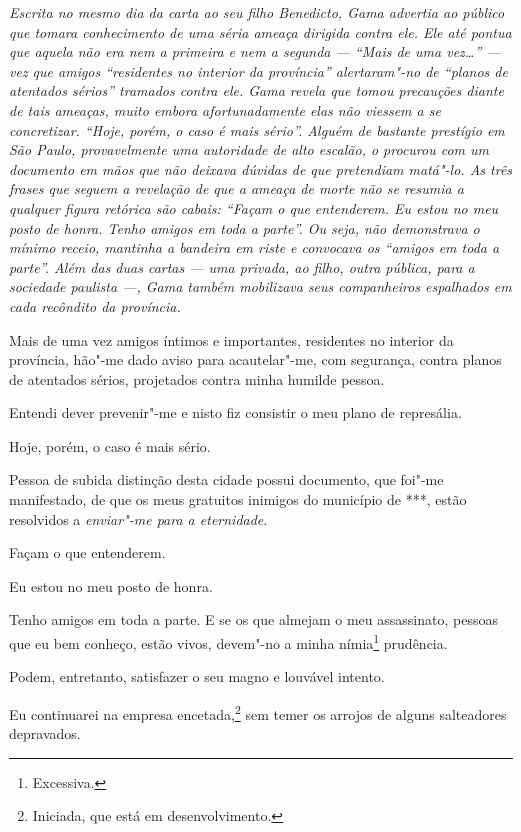\begin{flushleft}
{\footnotesize\itshape
Escrita no mesmo dia da carta ao seu filho Benedicto, Gama
advertia ao público que tomara conhecimento de uma séria ameaça dirigida
contra ele. Ele até pontua que aquela não era nem a primeira e nem a
segunda --- ``Mais de uma vez\ldots{}'' --- vez que amigos ``residentes no
interior da província'' alertaram"-no de ``planos de atentados sérios''
tramados contra ele. Gama revela que tomou precauções diante de tais
ameaças, muito embora afortunadamente elas não viessem a se concretizar.
``Hoje, porém, o caso é mais sério''. Alguém de bastante prestígio em São
Paulo, provavelmente uma autoridade de alto escalão, o procurou com um
documento em mãos que não deixava dúvidas de que pretendiam matá"-lo. As
três frases que seguem a revelação de que a ameaça de morte não se
resumia a qualquer figura retórica são cabais: ``Façam o que entenderem.
Eu estou no meu posto de honra. Tenho amigos em toda a parte''. Ou seja,
não demonstrava o mínimo receio, mantinha a bandeira em riste e
convocava os ``amigos em toda a parte''. Além das duas cartas --- uma
privada, ao filho, outra pública, para a sociedade paulista ---, Gama
também mobilizava seus companheiros espalhados em cada recôndito da
província.}
\end{flushleft}

\noindent{}Mais de uma vez amigos íntimos e importantes, residentes no interior da
província, hão"-me dado aviso para acautelar"-me, com segurança, contra
planos de atentados sérios, projetados contra minha humilde pessoa.

Entendi dever prevenir"-me e nisto fiz consistir o meu plano de
represália.

Hoje, porém, o caso é mais sério.

Pessoa de subida distinção desta cidade possui documento, que foi"-me
manifestado, de que os meus gratuitos inimigos do município de ***,
estão resolvidos a \emph{enviar"-me para a eternidade}.

Façam o que entenderem.

Eu estou no meu posto de honra.

Tenho amigos em toda a parte. E se os que almejam o meu assassinato,
pessoas que eu bem conheço, estão vivos, devem"-no a minha
nímia\footnote{Excessiva.} prudência.

Podem, entretanto, satisfazer o seu magno e louvável intento.

Eu continuarei na empresa encetada,\footnote{Iniciada, que está em
  desenvolvimento.} sem
temer os arrojos de alguns salteadores depravados.

